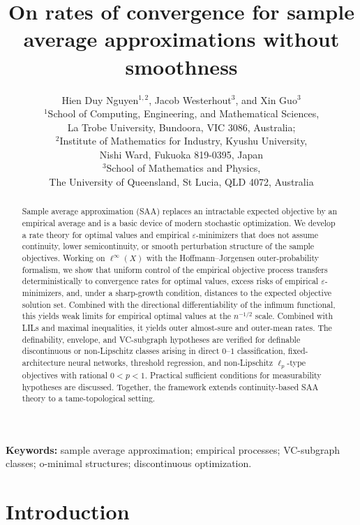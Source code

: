\documentclass[11pt]{article}
\title{On rates of convergence for sample average approximations without smoothness}
\author{Hien Duy Nguyen$^{1,2}$, Jacob Westerhout$^3$, and Xin Guo$^3$\\[0.4em]
{\small $^1$School of Computing, Engineering, and Mathematical Sciences,}\\
{\small La Trobe University, Bundoora, VIC 3086, Australia;}\\
{\small $^2$Institute of Mathematics for Industry, Kyushu University,}\\
{\small Nishi Ward, Fukuoka 819-0395, Japan}\\[0.2em]
{\small $^3$School of Mathematics and Physics,}\\
{\small The University of Queensland, St Lucia, QLD 4072, Australia}}
\begin{document}
\maketitle 

\begin{abstract}
Sample average approximation (SAA) replaces an intractable expected
objective by an empirical average and is a basic device of modern
stochastic optimization. We develop a rate theory for optimal values
and empirical $\varepsilon$-minimizers that does not assume continuity,
lower semicontinuity, or smooth perturbation structure of the sample
objectives. Working on $\ell^{\infty}(X)$ with the Hoffmann--Jørgensen
outer-probability formalism, we show that uniform control of the empirical
objective process transfers deterministically to convergence rates
for optimal values, excess risks of empirical $\varepsilon$-minimizers,
and, under a sharp-growth condition, distances to the expected objective
solution set. Combined with the directional differentiability of the
infimum functional, this yields weak limits for empirical optimal
values at the $n^{-1/2}$ scale. Combined with LILs and maximal inequalities,
it yields outer almost-sure and outer-mean rates. The definability, envelope,
and VC-subgraph hypotheses are verified for definable discontinuous
or non-Lipschitz classes arising in direct $0$--$1$ classification,
fixed-architecture neural networks, threshold regression, and non-Lipschitz
$\ell_{p}$-type objectives with rational $0<p<1$. Practical sufficient conditions for 
measurability hypotheses are discussed.
Together, the framework extends continuity-based SAA
theory to a tame-topological setting. 
\end{abstract}

\noindent\textbf{Keywords:} sample average approximation; empirical processes; VC-subgraph classes; o-minimal structures; discontinuous optimization.



\section{Introduction}
\end{document}
